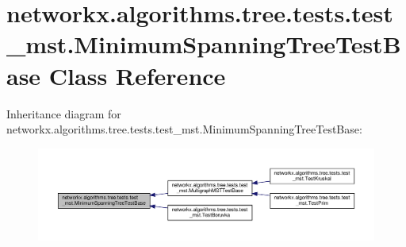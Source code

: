 \hypertarget{classnetworkx_1_1algorithms_1_1tree_1_1tests_1_1test__mst_1_1MinimumSpanningTreeTestBase}{}\section{networkx.\+algorithms.\+tree.\+tests.\+test\+\_\+mst.\+Minimum\+Spanning\+Tree\+Test\+Base Class Reference}
\label{classnetworkx_1_1algorithms_1_1tree_1_1tests_1_1test__mst_1_1MinimumSpanningTreeTestBase}


Inheritance diagram for networkx.\+algorithms.\+tree.\+tests.\+test\+\_\+mst.\+Minimum\+Spanning\+Tree\+Test\+Base\+:
\nopagebreak
\begin{figure}[H]
\begin{center}
\leavevmode
\includegraphics[width=350pt]{classnetworkx_1_1algorithms_1_1tree_1_1tests_1_1test__mst_1_1MinimumSpanningTreeTestBase__inherit__graph}
\end{center}
\end{figure}

